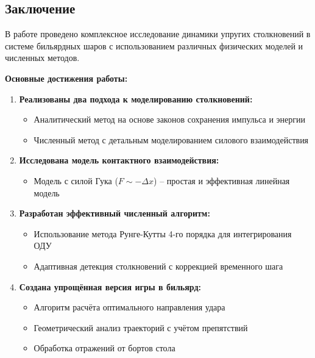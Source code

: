 \begin{center}
    \section{Заключение}
\end{center}

В работе проведено комплексное исследование динамики упругих столкновений в системе бильярдных шаров с использованием различных физических моделей и численных методов.

\textbf{Основные достижения работы:}

\begin{enumerate}
    \item \textbf{Реализованы два подхода к моделированию столкновений:}
    \begin{itemize}
        \item Аналитический метод на основе законов сохранения импульса и энергии
        \item Численный метод с детальным моделированием силового взаимодействия
    \end{itemize}

    \item \textbf{Исследована модель контактного взаимодействия:}
    \begin{itemize}
        \item Модель с силой Гука ($F \sim -\Delta x$) -- простая и эффективная линейная модель
    \end{itemize}

    \item \textbf{Разработан эффективный численный алгоритм:}
    \begin{itemize}
        \item Использование метода Рунге-Кутты 4-го порядка для интегрирования ОДУ
        \item Адаптивная детекция столкновений с коррекцией временного шага
    \end{itemize}

    \item \textbf{Создана упрощённая версия игры в бильярд:}
    \begin{itemize}
        \item Алгоритм расчёта оптимального направления удара
        \item Геометрический анализ траекторий с учётом препятствий
        \item Обработка отражений от бортов стола
    \end{itemize}
\end{enumerate}